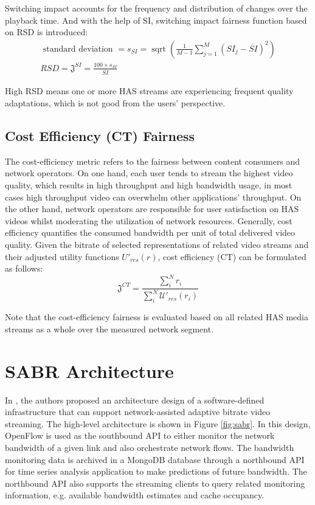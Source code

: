 \documentclass[12pt]{article}
\begin{document}
Switching impact accounts for the frequency and distribution of changes over the playback time. And with the help of SI, switching impact fairness function based on RSD is introduced:
\begin{equation}
\begin{gathered}
\text { standard deviation }=s_{S I}=\operatorname{sqrt}\left(\frac{1}{M-1} \sum_{j=1}^{M}\left(S I_{j}-\overline{S I}\right)^{2}\right) \\
R S D=\mathfrak{J}^{S I}=\frac{100 \times s_{S I}}{\overline{S I}}
\end{gathered}
\end{equation}

High RSD means one or more HAS streams are experiencing frequent quality adaptations, which is not good from the users' perspective.

\subsection{Cost Efficiency (CT) Fairness}
The cost-efficiency metric refers to the fairness between content consumers and network operators. On one hand, each user tends to stream the highest video quality, which results in high throughput and high bandwidth usage, in most cases high throughput video can overwhelm other applications’ throughput. On the other hand, network operators are responsible for user satisfaction on HAS videos whilst moderating the utilization of network resources.
Generally, cost efficiency quantifies the consumed bandwidth per unit of total delivered video quality. Given the bitrate of selected representations of related video streams and their adjusted utility functions $U\prime_{res}(r)$, cost efficiency (CT) can be formulated as follows:
\begin{equation}
\mathfrak{J}^{C T}=\frac{\sum_{i}^{N} r_{i}}{\sum_{i}^{N} \mathcal{U\prime}_{r e s}\left(r_{i}\right)}
\end{equation}

Note that the cost-efficiency fairness is evaluated based on all related HAS media streams as a whole over the measured network segment.

\section{SABR Architecture}
In \cite{bhat_network_2017}, the authors proposed an architecture design of a software-defined infrastructure that can support network-assisted adaptive bitrate video streaming. The high-level architecture is shown in Figure \ref{fig:sabr}. In this design, OpenFlow is used as the southbound API to either monitor the network bandwidth of a given link and also orchestrate network flows. The bandwidth monitoring data is archived in a MongoDB database through a northbound API for time series analysis application to make predictions of future bandwidth. The northbound API also supports the streaming clients to query related monitoring information, e.g. available bandwidth estimates and cache occupancy. 
\end{document}
